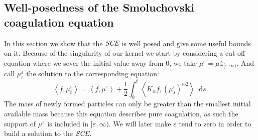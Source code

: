 \documentclass[11pt,a4paper]{article}
\newcommand{\RRP}{\mathbb{R}^+_*}
\newcommand{\MC}{\mathcal{M}}
\newcommand{\SCE}{\emph{SCE}}
\newcommand{\brac}[1]{\left\langle#1\right\rangle}
\newcommand{\dd}{\mathop{}\!\mathrm{d}}
\newtheorem{corollary}[theorem]{Corollary}
\begin{document}

\subsection{Well-posedness of the Smoluchovski coagulation equation}
In this section we show that the $\SCE$ is well posed and give some useful bounds on it. Because of the singularity of our kernel we start by considering a cut-off equation where we sever the initial value away from $0$, we take $\mu^\varepsilon = \mu\mathds{1}_{[\varepsilon,\infty)}$. And call $\mu^\varepsilon_t$ the solution to the corresponding equation:
\begin{equation}\label{eq:cutoff_SCE}
    \brac{f, \mu^\varepsilon_t} = \brac{f,\mu^\varepsilon} + \dfrac12\int_0^t \brac{K_\alpha f,\left(\mu^\varepsilon_s\right)^{\otimes 2}} \dd s.
\end{equation}
The mass of newly formed particles can only be greater than the smallest initial available mass because this equation describes pure coagulation, as such the support of $\mu^\varepsilon$ is included in $[\varepsilon,\infty)$. We will later make $\varepsilon$ tend to zero in order to build a solution to the $\SCE$.
\end{document}
